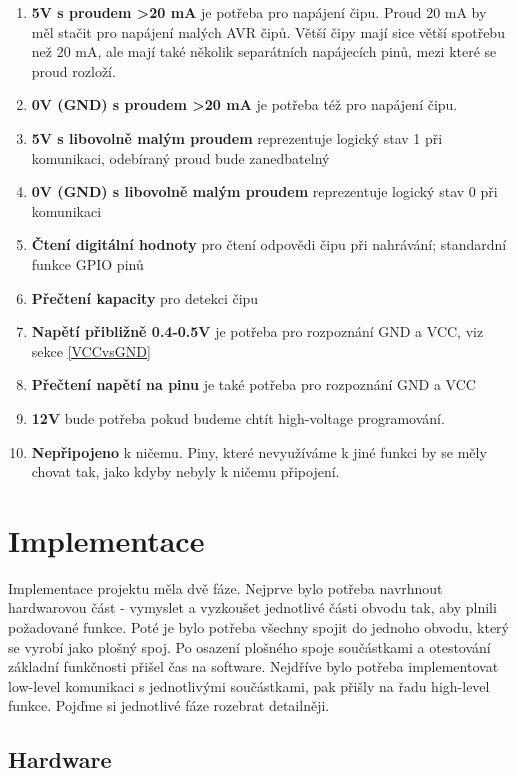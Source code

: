 \documentclass[11pt,a4paper,twoside,openright]{report}
\begin{document}
\begin{enumerate}
\item \textbf{5V s proudem >20 mA} je potřeba pro napájení čipu. Proud 20 mA by měl stačit pro napájení malých AVR čipů.\cite{attiny85} Větší čipy mají sice větší spotřebu než 20 mA, ale mají také několik separátních napájecích pinů, mezi které se proud rozloží.\cite{atmega328}
\item \textbf{0V (GND) s proudem >20 mA} je potřeba též pro napájení čipu. 
\item \textbf{5V s libovolně malým proudem} reprezentuje logický stav 1 při komunikaci, odebíraný proud bude zanedbatelný
\item \textbf{0V (GND) s libovolně malým proudem} reprezentuje logický stav 0 při komunikaci
\item \textbf{Čtení digitální hodnoty} pro čtení odpovědi čipu při nahrávání; standardní funkce GPIO pinů
\item \textbf{Přečtení kapacity} pro detekci čipu
\item \textbf{Napětí přibližně 0.4-0.5V} je potřeba pro rozpoznání GND a VCC, viz sekce \ref{VCCvsGND}
\item \textbf{Přečtení napětí na pinu} je také potřeba pro rozpoznání GND a VCC
\item \textbf{12V} bude potřeba pokud budeme chtít high-voltage programování.
\item \textbf{Nepřipojeno} k ničemu. Piny, které nevyužíváme k jiné funkci by se měly chovat tak, jako kdyby nebyly k ničemu připojení.
\end{enumerate}

\chapter{Implementace}

Implementace projektu měla dvě fáze. Nejprve bylo potřeba navrhnout hardwarovou část - vymyslet a vyzkoušet jednotlivé části obvodu tak, aby plnili požadované funkce. Poté je bylo potřeba všechny spojit do jednoho obvodu, který se vyrobí jako plošný spoj. Po osazení plošného spoje součástkami a otestování základní funkčnosti přišel čas na software. Nejdříve bylo potřeba implementovat low-level komunikaci s jednotlivými součástkami, pak přišly na řadu high-level funkce. Pojďme si jednotlivé fáze rozebrat detailněji.

\section {Hardware}
\end{document}

